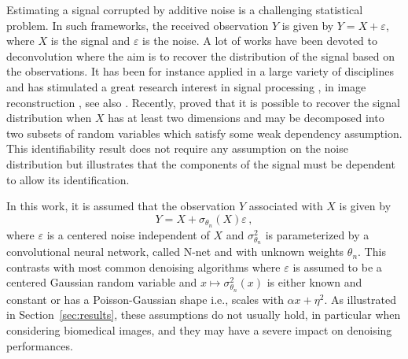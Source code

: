 \documentclass{article}
\begin{document}
Estimating a signal corrupted by additive noise  is a challenging statistical problem. In such frameworks, the received observation $Y$ is given by $Y = X + \varepsilon$,  where $X$ is the signal and $\varepsilon$ is the noise. A lot of works have been devoted to deconvolution where the aim is to recover the distribution of the signal based on the observations. It has been for instance applied in a large variety of disciplines and has stimulated a great research interest in signal processing \cite{moulines1997maximum,attias1998blind}, in image reconstruction \cite{kundur1996blind,campisi2017blind}, see also  \cite{meister:2009}. Recently, \cite{gassiat:lecorff:lehericy:2021} proved that it is possible to recover the signal distribution when $X$ has at least two dimensions and may be decomposed into two subsets of random variables which satisfy some weak dependency assumption. This identifiability result does not require any assumption on the noise distribution but illustrates that the components of the signal must be dependent to allow its identification. %

In this work, it is assumed that the observation $Y$ associated with $X$  is given by
\begin{equation}
\label{eq:def:Y}
Y = X + \sigma_{\theta_n}(X)\varepsilon\,,
\end{equation}
where $\varepsilon$ is a centered noise independent of $X$ and $\sigma^2_{\theta_n}$ is parameterized by a convolutional neural network, called N-net and with unknown weights $\theta_n$.
This contrasts with most common denoising algorithms where $\varepsilon$ is assumed to be a centered Gaussian random variable and  $x\mapsto \sigma^2_{\theta_n}(x)$ is either known and constant or has a Poisson-Gaussian shape i.e., scales with $\alpha x + \eta^2$.
As illustrated in Section~\ref{sec:results}, these assumptions do not usually hold, in particular when considering biomedical images, and they may have a severe impact on denoising performances.
\end{document}
